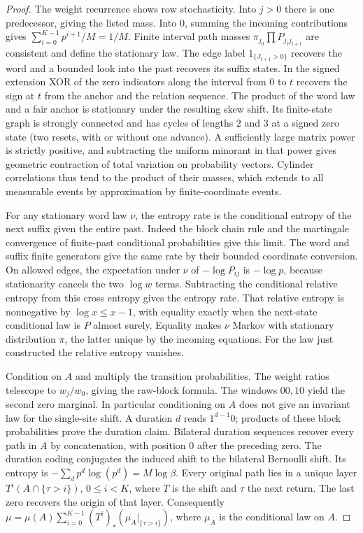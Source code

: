 \documentclass[11pt,reqno]{amsart}
\theoremstyle{definition}
\theoremstyle{remark}
\numberwithin{equation}{section}
\begin{document}
\begin{proof}
The weight recurrence shows row stochasticity. Into \(j>0\) there
is one predecessor, giving the listed mass. Into \(0\), summing
the incoming contributions gives \(\sum_{i=0}^{K-1}p^{i+1}/M=1/M\).
Finite interval path masses \(\pi_{j_0}\prod P_{j_tj_{t+1}}\)
are consistent and define the stationary law. The edge label
\(1_{\{J_{t+1}>0\}}\) recovers the word and a bounded look into the
past recovers its suffix states. In the signed extension XOR of the
zero indicators along the interval from \(0\) to \(t\) recovers the
sign at \(t\) from the anchor and the relation sequence. The product
of the word law and a fair anchor is stationary under the resulting
skew shift. Its finite-state graph is strongly connected and has
cycles of lengths \(2\) and \(3\) at a signed zero state (two resets,
with or without one advance). A sufficiently large matrix power
is strictly positive, and subtracting the uniform minorant in
that power gives geometric contraction of total variation on
probability vectors. Cylinder correlations thus tend to the product
of their masses, which extends to all measurable events by
approximation by finite-coordinate events.

For any stationary word law \(\nu\), the entropy rate is the
conditional entropy of the next suffix given the entire past.
Indeed the block chain rule and the martingale convergence of
finite-past conditional probabilities give this limit. The word
and suffix finite generators give the same rate by their bounded
coordinate conversion. On allowed edges, the expectation under
\(\nu\) of \(-\log P_{ij}\) is \(-\log p\), because stationarity
cancels the two \(\log w\) terms. Subtracting the conditional
relative entropy from this cross entropy gives the entropy rate.
That relative entropy is nonnegative by \(\log x\le x-1\), with
equality exactly when the next-state conditional law is \(P\)
almost surely. Equality makes \(\nu\) Markov with stationary
distribution \(\pi\), the latter unique by the incoming equations.
For the law just constructed the relative entropy vanishes.

Condition on \(A\) and multiply the transition probabilities.
The weight ratios telescope to \(w_j/w_0\), giving the raw-block
formula. The windows \(00,10\) yield the second zero marginal.
In particular conditioning on \(A\) does not give an invariant
law for the single-site shift. A duration \(d\) reads \(1^{d-1}0\);
products of these block probabilities prove the duration claim.
Bilateral duration sequences recover every path in \(A\) by
concatenation, with position \(0\) after the preceding zero.
The duration coding conjugates the induced shift to the bilateral
Bernoulli shift. Its entropy is
\(-\sum_d p^d\log(p^d)=M\log\beta\).
Every original path lies in a unique layer \(T^i(A\cap\{\tau>i\})\),
\(0\le i<K\), where \(T\) is the shift and \(\tau\) the next return.
The last zero recovers the origin of that layer. Consequently
\(\mu=\mu(A)\sum_{i=0}^{K-1}(T^i)_*(\mu_A|_{\{\tau>i\}})\),
where \(\mu_A\) is the conditional law on \(A\).
\end{proof}
\end{document}
